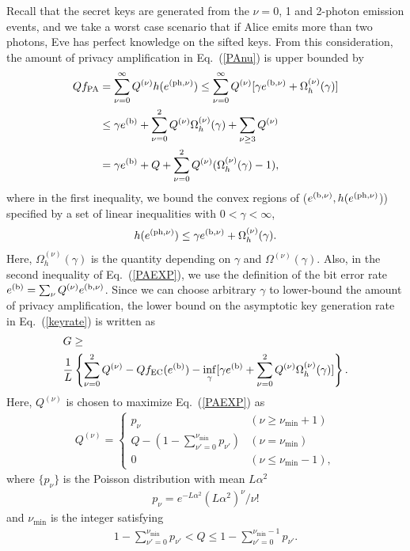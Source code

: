 \documentclass[prl,twocolumn,superscriptaddress,nofootinbib]{revtex4}
\def\U#1{{\rm #1}}
\begin{document}
Recall that the secret keys are generated from the $\nu=$0, 1 and 2-photon emission events,
and we take a worst case scenario that if Alice emits more than two photons, Eve has perfect knowledge on the sifted keys. 
From this consideration, the amount of privacy amplification in Eq.~(\ref{PAnu}) is upper bounded by
\begin{align}
  Qf_{\U{PA}}&=\sum^{\infty}_{\nu=0}Q^{(\nu)}h(e^{\U{(ph,\nu)}})
  \leq \sum^{\infty}_{\nu=0}Q^{(\nu)}[\gamma e^{\U{(\U{b},\nu)}}+\Omega^{(\nu)}_h(\gamma)]\notag\\
  &\leq \gamma e^{(\U{b})}+\sum^2_{\nu=0}Q^{(\nu)}\Omega^{(\nu)}_h(\gamma)+\sum_{\nu\geq3}Q^{(\nu)}\notag\\
  &= \gamma e^{(\U{b})}+Q+\sum^2_{\nu=0}Q^{(\nu)}(\Omega^{(\nu)}_h(\gamma)-1),
  \label{PAEXP}
\end{align}
where in the first inequality, we bound the convex regions of ($e^{(\U{b},\nu)},h(e^{(\U{ph},\nu)}$))
specified by a set of linear inequalities with $0<\gamma<\infty$,
\begin{align}
h(e^{(\U{ph},\nu)})\leq \gamma e^{(\U{b},\nu)}+\Omega^{(\nu)}_h(\gamma).
\end{align}
Here, $\Omega^{(\nu)}_h(\gamma)$ is the quantity depending on $\gamma$ and $\Omega^{(\nu)}(\gamma)$. 
Also, in the second inequality of Eq.~(\ref{PAEXP}),
we use the definition of the bit error rate $e^{(\U{b})}=\sum_{\nu}Q^{(\nu)}e^{\U{(\U{b},\nu)}}$. 
Since we can choose arbitrary $\gamma$ to lower-bound the amount of privacy amplification,
the lower bound on the asymptotic key generation rate in Eq.~(\ref{keyrate}) is written as
\begin{align}
  &G\geq\notag\\
  &\frac{1}{L}
  \left\{\sum^2_{\nu=0}Q^{(\nu)}-Qf_{\U{EC}}(e^{(\U{b})})-\inf_{\gamma}[\gamma e^{(\U{b})}+\sum^2_{\nu=0}Q^{(\nu)}\Omega^{(\nu)}_h(\gamma)]\right\}.
\end{align}
Here, $Q^{(\nu)}$ is chosen to maximize Eq.~(\ref{PAEXP}) as~\cite{Kiyoshi2012dps}
\begin{align}
  Q^{(\nu)}=
  \begin{cases}
    p_{\nu}&  (\nu\geq \nu_{\min}+1)\\
    Q-(1-\sum^{\nu_{\min}}_{\nu'=0}p_{\nu'})& (\nu=\nu_{\min})\\
    0 & (\nu\leq \nu_{\min}-1),
    \end{cases}
  \end{align}
where $\{p_{\nu}\}$ is the Poisson distribution with mean $L\alpha^2$
\begin{align}
p_{\nu}=e^{-L\alpha^2}(L\alpha^2)^\nu/\nu!
  \end{align}
and $\nu_{\min}$ is the integer satisfying
\begin{align}
1-\sum^{\nu_{\min}}_{\nu'=0}p_{\nu'}< Q\leq 1-\sum^{\nu_{\min}-1}_{\nu'=0}p_{\nu'}.
  \end{align}
\end{document}

